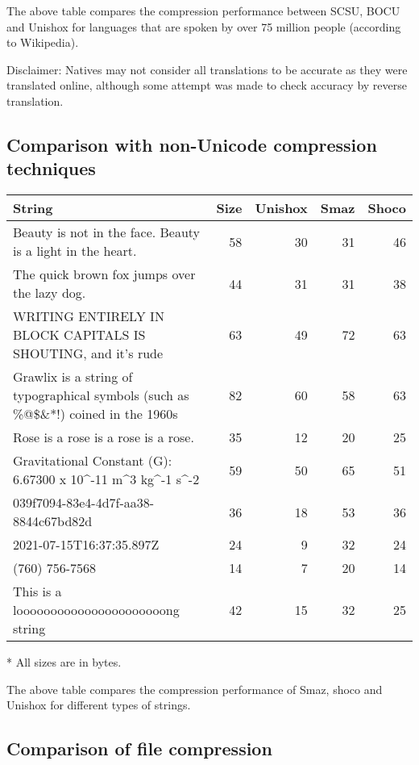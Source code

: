 \documentclass[]{article}
\begin{document}
The above table compares the compression performance between SCSU, BOCU and Unishox for languages that are spoken by over 75 million people (according to Wikipedia).

Disclaimer: Natives may not consider all translations to be accurate as they were translated online, although some attempt was made to check accuracy by reverse translation.

\subsection{Comparison with non-Unicode compression techniques}

\begin{tabular}{ | p{} | r | r | r | r |} \hline
\textbf{String} & \textbf{Size} & \textbf{Unishox} & \textbf{Smaz} & \textbf{Shoco} \\ \hline
Beauty is not in the face. Beauty is a light in the heart. & 58 & 30 & 31 & 46 \\ \hline
The quick brown fox jumps over the lazy dog. & 44 & 31 & 31 & 38 \\ \hline
WRITING ENTIRELY IN BLOCK CAPITALS IS SHOUTING, and it’s rude & 63 & 49 & 72 & 63 \\ \hline
Grawlix is a string of typographical symbols (such as \%@\$\&*!) coined in the 1960s & 82 & 60 & 58 & 63 \\ \hline
Rose is a rose is a rose is a rose. & 35 & 12 & 20 & 25 \\ \hline
Gravitational Constant (G): 6.67300 x 10\^{}-11 m\^{}3 kg\^{}-1 s\^{}-2 & 59 & 50 & 65 & 51 \\ \hline
039f7094-83e4-4d7f-aa38-8844c67bd82d & 36 & 18 & 53 & 36 \\ \hline
2021-07-15T16:37:35.897Z & 24 & 9 & 32 & 24 \\ \hline
(760) 756-7568 & 14 & 7 & 20 & 14 \\ \hline
This is a loooooooooooooooooooooong string & 42 & 15 & 32 & 25 \\ \hline
\end{tabular}
* All sizes are in bytes.

The above table compares the compression performance of Smaz, shoco and Unishox for different types of strings.

\subsection{Comparison of file compression}
\end{document}
